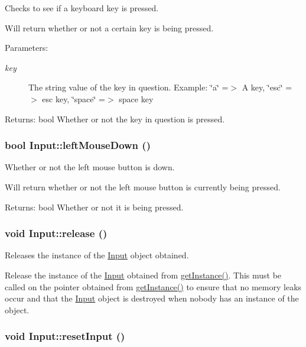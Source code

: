 Checks to see if a keyboard key is pressed. 

Will return whether or not a certain key is being pressed. \begin{Desc}
\item[Parameters:]
\begin{description}
\item[{\em key}]The string value of the key in question. Example: \char`\"{}a\char`\"{} =$>$ A key, \char`\"{}esc\char`\"{} =$>$ esc key, \char`\"{}space\char`\"{} =$>$ space key \end{description}
\end{Desc}
\begin{Desc}
\item[Returns:]bool Whether or not the key in question is pressed. \end{Desc}
\hypertarget{class_input_b83a65acc24c327fc49b9048a5d9ddda}{
\subsubsection[{leftMouseDown}]{\setlength{\rightskip}{0pt plus 5cm}bool Input::leftMouseDown ()}}
\label{class_input_b83a65acc24c327fc49b9048a5d9ddda}


Whether or not the left mouse button is down. 

Will return whether or not the left mouse button is currently being pressed. \begin{Desc}
\item[Returns:]bool Whether or not it is being pressed. \end{Desc}
\hypertarget{class_input_689ecae5f4ce62f81fe18386148416c3}{
\subsubsection[{release}]{\setlength{\rightskip}{0pt plus 5cm}void Input::release ()}}
\label{class_input_689ecae5f4ce62f81fe18386148416c3}


Releases the instance of the \hyperlink{class_input}{Input} object obtained. 

Release the instance of the \hyperlink{class_input}{Input} obtained from \hyperlink{class_input_10aa6d0ec967a2c9f424ebe3aa4afdb2}{getInstance()}. This must be called on the pointer obtained from \hyperlink{class_input_10aa6d0ec967a2c9f424ebe3aa4afdb2}{getInstance()} to ensure that no memory leaks occur and that the \hyperlink{class_input}{Input} object is destroyed when nobody has an instance of the object. \hypertarget{class_input_d9bf02faaf716bc455388390f4cf25c1}{
\subsubsection[{resetInput}]{\setlength{\rightskip}{0pt plus 5cm}void Input::resetInput ()}}
\label{class_input_d9bf02faaf716bc455388390f4cf25c1}


